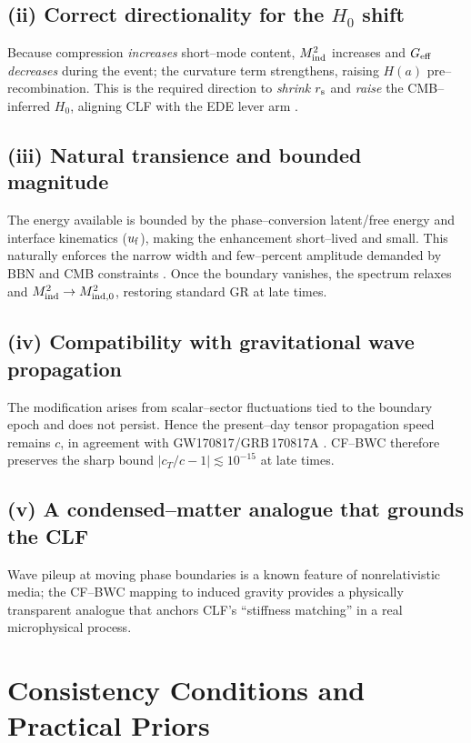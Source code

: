 \documentclass[11pt,a4paper]{article}
\newcommand{\rs}{r_{\rm s}}
\newcommand{\Geff}{G_{\rm eff}}
\begin{document}
\subsection*{(ii) Correct directionality for the $H_0$ shift}
Because compression \emph{increases} short--mode content, $M_{\rm ind}^2$ increases and $\Geff$ \emph{decreases} during the event; the curvature term strengthens, raising $H(a)$ pre--recombination. This is the required direction to \emph{shrink} $\rs$ and \emph{raise} the CMB--inferred $H_0$, aligning CLF with the EDE lever arm \cite{EDEReview2023,PoulinReview2023}.

\subsection*{(iii) Natural transience and bounded magnitude}
The energy available is bounded by the phase--conversion latent/free energy and interface kinematics ($u_{\rm f}$), making the enhancement short--lived and small. This naturally enforces the narrow width and few--percent amplitude demanded by BBN and CMB constraints \cite{Planck2018,Alvey2020}. Once the boundary vanishes, the spectrum relaxes and $M_{\rm ind}^2 \to M_{\rm ind,0}^2$, restoring standard GR at late times.

\subsection*{(iv) Compatibility with gravitational wave propagation}
The modification arises from scalar--sector fluctuations tied to the boundary epoch and does not persist. Hence the present--day tensor propagation speed remains $c$, in agreement with GW170817/GRB\,170817A \cite{GW170817}. CF--BWC therefore preserves the sharp bound $|c_T/c-1|\lesssim 10^{-15}$ at late times.

\subsection*{(v) A condensed--matter analogue that grounds the CLF}
Wave pileup at moving phase boundaries is a known feature of nonrelativistic media; the CF--BWC mapping to induced gravity provides a physically transparent analogue that anchors CLF's ``stiffness matching'' in a real microphysical process.

\section{Consistency Conditions and Practical Priors}
\end{document}
